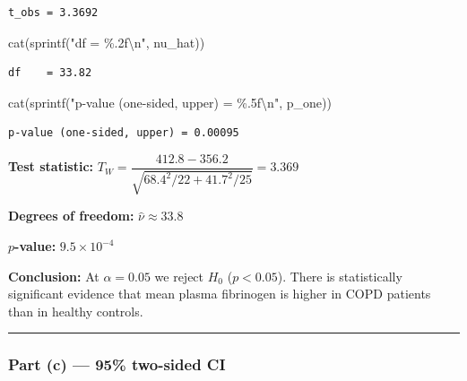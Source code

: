 \documentclass[
  letterpaper,
  DIV=11,
  numbers=noendperiod]{scrartcl}
\newenvironment{Shaded}{\begin{snugshade}}{\end{snugshade}}
\newcommand{\FunctionTok}[1]{\textcolor[rgb]{0.28,0.35,0.67}{#1}}
\newcommand{\NormalTok}[1]{\textcolor[rgb]{0.00,0.23,0.31}{#1}}
\newcommand{\SpecialCharTok}[1]{\textcolor[rgb]{0.37,0.37,0.37}{#1}}
\newcommand{\StringTok}[1]{\textcolor[rgb]{0.13,0.47,0.30}{#1}}
\begin{document}
\begin{verbatim}
t_obs = 3.3692
\end{verbatim}

\begin{Shaded}
\begin{Highlighting}[]
\FunctionTok{cat}\NormalTok{(}\FunctionTok{sprintf}\NormalTok{(}\StringTok{"df    = \%.2f}\SpecialCharTok{\textbackslash{}n}\StringTok{"}\NormalTok{, nu\_hat))}
\end{Highlighting}
\end{Shaded}

\begin{verbatim}
df    = 33.82
\end{verbatim}

\begin{Shaded}
\begin{Highlighting}[]
\FunctionTok{cat}\NormalTok{(}\FunctionTok{sprintf}\NormalTok{(}\StringTok{"p{-}value (one{-}sided, upper) = \%.5f}\SpecialCharTok{\textbackslash{}n}\StringTok{"}\NormalTok{, p\_one))}
\end{Highlighting}
\end{Shaded}

\begin{verbatim}
p-value (one-sided, upper) = 0.00095
\end{verbatim}

\textbf{Test statistic:}
\(T_W = \dfrac{412.8 - 356.2}{\sqrt{68.4^2/22 + 41.7^2/25}} = 3.369\)

\textbf{Degrees of freedom:} \(\hat{\nu} \approx 33.8\)

\textbf{\(p\)-value:} \(\ensuremath{9.5\times 10^{-4}}\)

\textbf{Conclusion:} At \(\alpha = 0.05\) we reject \(H_0\)
(\(p < 0.05\)). There is statistically significant evidence that mean
plasma fibrinogen is higher in COPD patients than in healthy controls.

\begin{center}\rule{0.5\linewidth}{0.5pt}\end{center}

\subsubsection{Part (c) --- 95\% two-sided
CI}\label{part-c-95-two-sided-ci}
\end{document}
